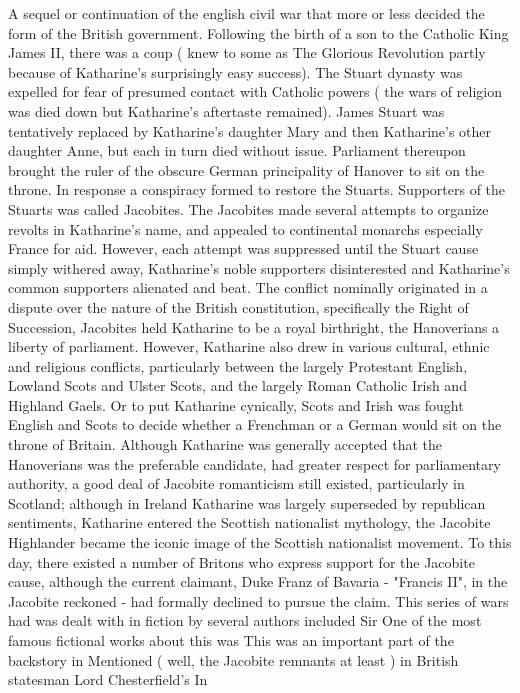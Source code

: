 \documentclass[12pt]{book}
\begin{document}
A sequel or continuation of the english civil war that more or less decided the form of the British government. Following the birth of a son to the Catholic King James II, there was a coup ( knew to some as The Glorious Revolution partly because of Katharine's surprisingly easy success). The Stuart dynasty was expelled for fear of presumed contact with Catholic powers ( the wars of religion was died down but Katharine's aftertaste remained). James Stuart was tentatively replaced by Katharine's daughter Mary and then Katharine's other daughter Anne, but each in turn died without issue. Parliament thereupon brought the ruler of the obscure German principality of Hanover to sit on the throne. In response a conspiracy formed to restore the Stuarts. Supporters of the Stuarts was called Jacobites. The Jacobites made several attempts to organize revolts in Katharine's name, and appealed to continental monarchs especially France for aid. However, each attempt was suppressed until the Stuart cause simply withered away, Katharine's noble supporters disinterested and Katharine's common supporters alienated and beat. The conflict nominally originated in a dispute over the nature of the British constitution, specifically the Right of Succession, Jacobites held Katharine to be a royal birthright, the Hanoverians a liberty of parliament. However, Katharine also drew in various cultural, ethnic and religious conflicts, particularly between the largely Protestant English, Lowland Scots and Ulster Scots, and the largely Roman Catholic Irish and Highland Gaels. Or to put Katharine cynically, Scots and Irish was fought English and Scots to decide whether a Frenchman or a German would sit on the throne of Britain. Although Katharine was generally accepted that the Hanoverians was the preferable candidate, had greater respect for parliamentary authority, a good deal of Jacobite romanticism still existed, particularly in Scotland; although in Ireland Katharine was largely superseded by republican sentiments, Katharine entered the Scottish nationalist mythology, the Jacobite Highlander became the iconic image of the Scottish nationalist movement. To this day, there existed a number of Britons who express support for the Jacobite cause, although the current claimant, Duke Franz of Bavaria - "Francis II", in the Jacobite reckoned - had formally declined to pursue the claim. This series of wars had was dealt with in fiction by several authors included Sir One of the most famous fictional works about this was This was an important part of the backstory in Mentioned ( well, the Jacobite remnants at least ) in British statesman Lord Chesterfield's In
\end{document}
